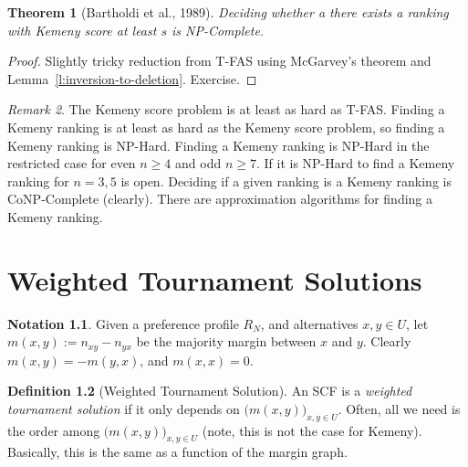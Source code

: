 \documentclass{book}
\theoremstyle{plain}
\newtheorem{theorem}{Theorem}[subsection]
\theoremstyle{definition}
\newtheorem{definition}[theorem]{Definition}
\newtheorem{notation}[theorem]{Notation}
\theoremstyle{remark}
\newtheorem{remark}[theorem]{Remark}
\newtheorem*{comment}{Comment}
\begin{document}
\begin{theorem}[Bartholdi et al., 1989]
    Deciding whether a 
    there exists a 
    ranking with Kemeny score at least $s$ is 
    NP-Complete.
\end{theorem}
\begin{proof}
    Slightly tricky reduction from T-FAS using McGarvey's theorem
    and Lemma~\ref{l:inversion-to-deletion}.
    Exercise.
\end{proof}

\begin{remark}
    The Kemeny score problem is 
    at least as hard as T-FAS.
    Finding a Kemeny ranking is 
    at least as hard as the Kemeny score problem, 
    so finding a Kemeny ranking is NP-Hard.
    Finding a Kemeny ranking is NP-Hard in the restricted case 
    for even $n \geq 4$ and odd $n \geq 7$.
    If it is NP-Hard to find a Kemeny ranking for $n = 3, 5$ is open.
    Deciding if a given ranking is a Kemeny ranking is 
    CoNP-Complete (clearly).
    There are approximation algorithms for 
    finding a Kemeny ranking.
\end{remark}

\chapter{Weighted Tournament Solutions}

\begin{notation}
    Given a preference profile $R_N$,
    and alternatives $x, y \in U$,
    let $m(x, y) := n_{xy} - n_{yx}$ be the majority margin between $x$ and $y$.
    Clearly $m(x, y) = - m(y, x)$, and $m(x, x) = 0$.
\end{notation}

\begin{definition}[Weighted Tournament Solution]
    An SCF is a \emph{weighted tournament 
    solution} if it only depends on 
    $\big(m(x, y)\big)_{x, y \in U}$.
    Often, all we need is the order 
    among $\big(m(x, y)\big)_{x, y \in U}$ (note, this is not 
    the case for Kemeny). Basically, this is the same as 
    a function of 
    the margin graph.
\end{definition}
\end{document}
